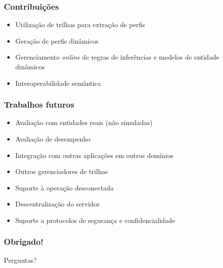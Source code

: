 \documentclass[14pt]{beamer}
\begin{document}

\begin{frame}
  \frametitle{Contribuições}
  \begin{itemize}
    \item Utilização de trilhas para extração de perfis
    \item Geração de perfis dinâmicos
    \item Gerenciamento {\em online} de regras de inferências e modelos de entidade dinâmicos 
    \item Interoperabilidade semântica
  \end{itemize}
\end{frame}


\begin{frame}
  \frametitle{Trabalhos futuros}
  \begin{itemize}
    \item Avaliação com entidades reais (não simuladas)
    \item Avaliação de desempenho
    \item Integração com outras aplicações em outros domínios
    \item Outros gerenciadores de trilhas
    \item Suporte à operação desconectada
    \item Descentralização do servidor
    \item Suporte a protocolos de segurança e confidencialidade
  \end{itemize}
\end{frame}


\begin{frame}
  \frametitle{Obrigado!}
  Perguntas?
\end{frame}
\end{document}
